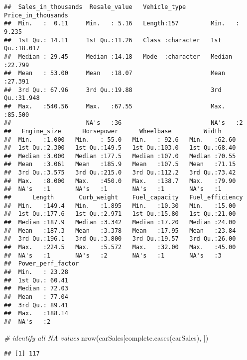 \documentclass[
]{article}
\newenvironment{Shaded}{\begin{snugshade}}{\end{snugshade}}
\newcommand{\CommentTok}[1]{\textcolor[rgb]{0.56,0.35,0.01}{\textit{#1}}}
\newcommand{\FunctionTok}[1]{\textcolor[rgb]{0.00,0.00,0.00}{#1}}
\newcommand{\NormalTok}[1]{#1}
\begin{document}
\begin{verbatim}
##  Sales_in_thousands  Resale_value   Vehicle_type       Price_in_thousands
##  Min.   :  0.11     Min.   : 5.16   Length:157         Min.   : 9.235    
##  1st Qu.: 14.11     1st Qu.:11.26   Class :character   1st Qu.:18.017    
##  Median : 29.45     Median :14.18   Mode  :character   Median :22.799    
##  Mean   : 53.00     Mean   :18.07                      Mean   :27.391    
##  3rd Qu.: 67.96     3rd Qu.:19.88                      3rd Qu.:31.948    
##  Max.   :540.56     Max.   :67.55                      Max.   :85.500    
##                     NA's   :36                         NA's   :2         
##   Engine_size      Horsepower      Wheelbase         Width      
##  Min.   :1.000   Min.   : 55.0   Min.   : 92.6   Min.   :62.60  
##  1st Qu.:2.300   1st Qu.:149.5   1st Qu.:103.0   1st Qu.:68.40  
##  Median :3.000   Median :177.5   Median :107.0   Median :70.55  
##  Mean   :3.061   Mean   :185.9   Mean   :107.5   Mean   :71.15  
##  3rd Qu.:3.575   3rd Qu.:215.0   3rd Qu.:112.2   3rd Qu.:73.42  
##  Max.   :8.000   Max.   :450.0   Max.   :138.7   Max.   :79.90  
##  NA's   :1       NA's   :1       NA's   :1       NA's   :1      
##      Length       Curb_weight    Fuel_capacity   Fuel_efficiency
##  Min.   :149.4   Min.   :1.895   Min.   :10.30   Min.   :15.00  
##  1st Qu.:177.6   1st Qu.:2.971   1st Qu.:15.80   1st Qu.:21.00  
##  Median :187.9   Median :3.342   Median :17.20   Median :24.00  
##  Mean   :187.3   Mean   :3.378   Mean   :17.95   Mean   :23.84  
##  3rd Qu.:196.1   3rd Qu.:3.800   3rd Qu.:19.57   3rd Qu.:26.00  
##  Max.   :224.5   Max.   :5.572   Max.   :32.00   Max.   :45.00  
##  NA's   :1       NA's   :2       NA's   :1       NA's   :3      
##  Power_perf_factor
##  Min.   : 23.28   
##  1st Qu.: 60.41   
##  Median : 72.03   
##  Mean   : 77.04   
##  3rd Qu.: 89.41   
##  Max.   :188.14   
##  NA's   :2
\end{verbatim}

\begin{Shaded}
\begin{Highlighting}[]
\CommentTok{\# identify all NA values}
\FunctionTok{nrow}\NormalTok{(carSales[}\FunctionTok{complete.cases}\NormalTok{(carSales), ])}
\end{Highlighting}
\end{Shaded}

\begin{verbatim}
## [1] 117
\end{verbatim}
\end{document}
